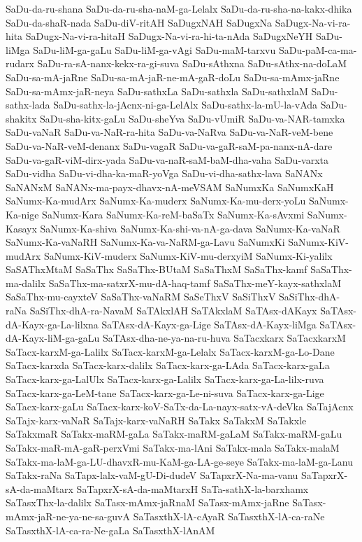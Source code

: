 {SaDu-da-ru-shana
SaDu-da-ru-sha-naM-ga-Lelalx
SaDu-da-ru-sha-na-kakx-dhika
SaDu-da-shaR-nada
SaDu-diV-ritAH
SaDugxNAH
SaDugxNa
SaDugx-Na-vi-ra-hita
SaDugx-Na-vi-ra-hitaH
SaDugx-Na-vi-ra-hi-ta-nAda
SaDugxNeYH
SaDu-liMga
SaDu-liM-ga-gaLu
SaDu-liM-ga-vAgi
SaDu-maM-tarxvu
SaDu-paM-ca-ma-rudarx
SaDu-ra-sA-nanx-kekx-ra-gi-suva
SaDu-sAthxna
SaDu-sAthx-na-doLaM
SaDu-sa-mA-jaRne
SaDu-sa-mA-jaR-ne-mA-gaR-doLu
SaDu-sa-mAmx-jaRne
SaDu-sa-mAmx-jaR-neya
SaDu-sathxLa
SaDu-sathxla
SaDu-sathxlaM
SaDu-sathx-lada
SaDu-sathx-la-jAcnx-ni-ga-LelAlx
SaDu-sathx-la-mU-la-vAda
SaDu-shakitx
SaDu-sha-kitx-gaLu
SaDu-sheYva
SaDu-vUmiR
SaDu-va-NAR-tamxka
SaDu-vaNaR
SaDu-va-NaR-ra-hita
SaDu-va-NaRva
SaDu-va-NaR-veM-bene
SaDu-va-NaR-veM-denanx
SaDu-vagaR
SaDu-va-gaR-saM-pa-nanx-nA-dare
SaDu-va-gaR-viM-dirx-yada
SaDu-va-naR-saM-baM-dha-vaha
SaDu-varxta
SaDu-vidha
SaDu-vi-dha-ka-maR-yoVga
SaDu-vi-dha-sathx-lava
SaNANx
SaNANxM
SaNANx-ma-payx-dhavx-nA-meVSAM
SaNumxKa
SaNumxKaH
SaNumx-Ka-mudArx
SaNumx-Ka-muderx
SaNumx-Ka-mu-derx-yoLu
SaNumx-Ka-nige
SaNumx-Kara
SaNumx-Ka-reM-baSaTx
SaNumx-Ka-sAvxmi
SaNumx-Kasayx
SaNumx-Ka-shiva
SaNumx-Ka-shi-va-nA-ga-dava
SaNumx-Ka-vaNaR
SaNumx-Ka-vaNaRH
SaNumx-Ka-va-NaRM-ga-Lavu
SaNumxKi
SaNumx-KiV-mudArx
SaNumx-KiV-muderx
SaNumx-KiV-mu-derxyiM
SaNumx-Ki-yalilx
SaSAThxMtaM
SaSaThx
SaSaThx-BUtaM
SaSaThxM
SaSaThx-kamf
SaSaThx-ma-dalilx
SaSaThx-ma-satxrX-mu-dA-haq-tamf
SaSaThx-meY-kayx-sathxlaM
SaSaThx-mu-cayxteV
SaSaThx-vaNaRM
SaSeThxV
SaSiThxV
SaSiThx-dhA-raNa
SaSiThx-dhA-ra-NavaM
SaTAkxlAH
SaTAkxlaM
SaTAsx-dAKayx
SaTAsx-dA-Kayx-ga-La-lilxna
SaTAsx-dA-Kayx-ga-Lige
SaTAsx-dA-Kayx-liMga
SaTAsx-dA-Kayx-liM-ga-gaLu
SaTAsx-dha-ne-ya-na-ru-huva
SaTacxkarx
SaTacxkarxM
SaTacx-karxM-ga-Lalilx
SaTacx-karxM-ga-Lelalx
SaTacx-karxM-ga-Lo-Dane
SaTacx-karxda
SaTacx-karx-dalilx
SaTacx-karx-ga-LAda
SaTacx-karx-gaLa
SaTacx-karx-ga-LalUlx
SaTacx-karx-ga-Lalilx
SaTacx-karx-ga-La-lilx-ruva
SaTacx-karx-ga-LeM-tane
SaTacx-karx-ga-Le-ni-suva
SaTacx-karx-ga-Lige
SaTacx-karx-gaLu
SaTacx-karx-koV-SaTx-da-La-nayx-satx-vA-deVka
SaTajAcnx
SaTajx-karx-vaNaR
SaTajx-karx-vaNaRH
SaTakx
SaTakxM
SaTakxle
SaTakxmaR
SaTakx-maRM-gaLa
SaTakx-maRM-gaLaM
SaTakx-maRM-gaLu
SaTakx-maR-mA-gaR-perxVmi
SaTakx-ma-lAni
SaTakx-mala
SaTakx-malaM
SaTakx-ma-laM-ga-LU-dhavxR-mu-KaM-ga-LA-ge-seye
SaTakx-ma-laM-ga-Lanu
SaTakx-raNa
SaTapx-lalx-vaM-gU-Di-dudeV
SaTapxrX-Na-ma-vanu
SaTapxrX-sA-da-maMtarx
SaTapxrX-sA-da-maMtarxH
SaTa-sathX-la-barxhamx
SaTasxThx-la-dalilx
SaTasx-mAmx-jaRnaM
SaTasx-mAmx-jaRne
SaTasx-mAmx-jaR-ne-ya-ne-sa-guvA
SaTasxthX-lA-cAyaR
SaTasxthX-lA-ca-raNe
SaTasxthX-lA-ca-ra-Ne-gaLa
SaTasxthX-lAnAM
}

